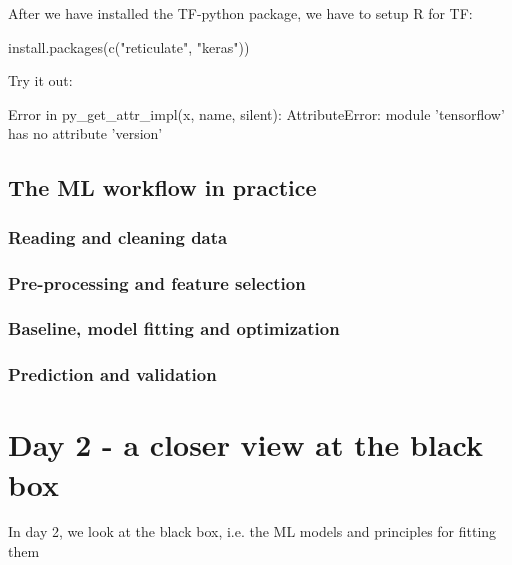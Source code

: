 \documentclass[a4paper,twoside]{tufte-book}\usepackage[]{graphicx}\usepackage[]{color}
\begin{document}
After we have installed the TF-python package, we have to setup R for TF:
\begin{Schunk}
\begin{Sinput}
install.packages(c("reticulate", "keras"))
\end{Sinput}
\end{Schunk}
Try it out:
\begin{Schunk}
\begin{Soutput}
Error in py_get_attr_impl(x, name, silent): AttributeError: module 'tensorflow' has no attribute 'version'
\end{Soutput}
\end{Schunk}


\section{The ML workflow in practice }

\subsection{Reading and cleaning data}

\subsection{Pre-processing and feature selection}

\subsection{Baseline, model fitting and optimization}

\subsection{Prediction and validation}


\chapter{Day 2 - a closer view at the black box}

In day 2, we look at the black box, i.e. the ML models and principles for fitting them

\end{document}

